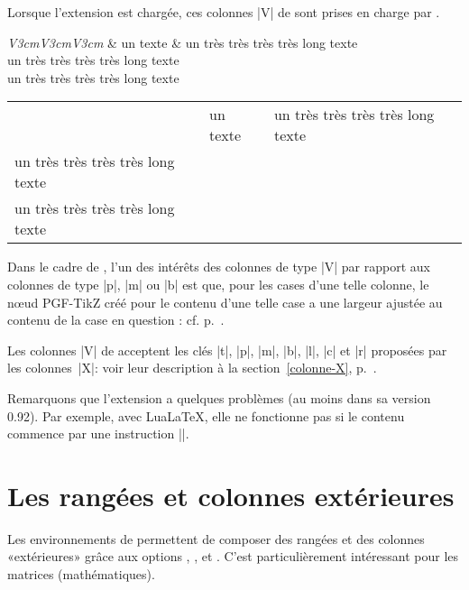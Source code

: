 \documentclass[dvipsnames]{article}%
\begin{document}
\medskip
Lorsque l'extension  est chargée, ces colonnes |V| de
 sont prises en charge par . 

\medskip
\begin{Code}
\begin{NiceTabular}[corners=NW,hvlines]{\emph{V{3cm}V{3cm}V{3cm}}}
& un texte & un très très très très long texte \\
un très très très très long texte \\
un très très très très long texte 
\end{NiceTabular}
\end{Code}

\medskip
\begin{center}
\begin{NiceTabular}[corners=NW,hvlines]{V{3cm}V{3cm}V{3cm}}
& un texte & un très très très très long texte \\
un très très très très long texte \\
un très très très très long texte 
\end{NiceTabular}
\end{center}


Dans le cadre de
, l'un des intérêts des colonnes de type |V| par rapport aux
colonnes de type |p|, |m| ou |b| est que, pour les cases d'une telle colonne,
le nœud PGF-TikZ créé pour le contenu d'une telle case a une largeur ajustée
au contenu de la case en question : cf. p.~\pageref{node-V}. 


\medskip
Les colonnes |V| de  acceptent les clés |t|, |p|, |m|, |b|, |l|,
|c| et |r| proposées par les colonnes~|X|: voir leur description à la section~\ref{colonne-X},
p.~\pageref{colonne-X}. 

\medskip
Remarquons que l'extension  a quelques problèmes (au moins dans sa
version 0.92). Par exemple, avec LuaLaTeX, elle ne fonctionne pas si le contenu
commence par une instruction |\color|.


\medskip
\section{Les rangées et colonnes extérieures}


Les environnements de  permettent de composer des rangées et des
colonnes «extérieures» grâce aux options ,
,  et . C'est
particulièrement intéressant pour les matrices (mathématiques).
\label{exterior}
\end{document}

